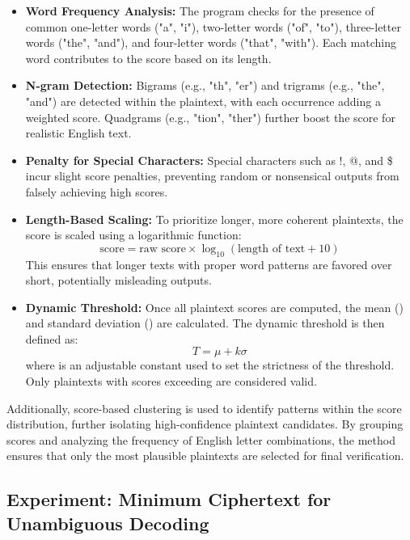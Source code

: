 \documentclass{article}
\begin{document}
\begin{itemize}
\item \textbf{Word Frequency Analysis:} The program checks for the presence of common one-letter words ("a", "i"), two-letter words ("of", "to"), three-letter words ("the", "and"), and four-letter words ("that", "with"). Each matching word contributes to the score based on its length.
\item \textbf{N-gram Detection:} Bigrams (e.g., "th", "er") and trigrams (e.g., "the", "and") are detected within the plaintext, with each occurrence adding a weighted score. Quadgrams (e.g., "tion", "ther") further boost the score for realistic English text.
\item \textbf{Penalty for Special Characters:} Special characters such as !, @, and \$ incur slight score penalties, preventing random or nonsensical outputs from falsely achieving high scores.
\item \textbf{Length-Based Scaling:} To prioritize longer, more coherent plaintexts, the score is scaled using a logarithmic function:
\begin{equation}
\text{score} = \text{raw score} \times \log_{10}(\text{length of text} + 10)
\end{equation}
This ensures that longer texts with proper word patterns are favored over short, potentially misleading outputs.
\item \textbf{Dynamic Threshold:} Once all plaintext scores are computed, the mean () and standard deviation () are calculated. The dynamic threshold  is then defined as:
\begin{equation}
T = \mu + k\sigma
\end{equation}
where  is an adjustable constant used to set the strictness of the threshold. Only plaintexts with scores exceeding  are considered valid.
\end{itemize}

Additionally, score-based clustering is used to identify patterns within the score distribution, further isolating high-confidence plaintext candidates. By grouping scores and analyzing the frequency of English letter combinations, the method ensures that only the most plausible plaintexts are selected for final verification.

\subsection{Experiment: Minimum Ciphertext for Unambiguous Decoding}
\end{document}
